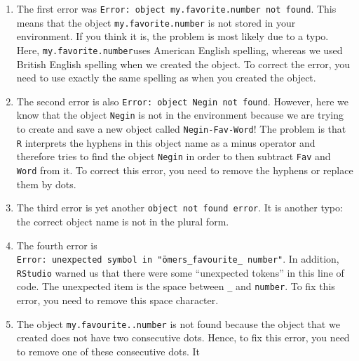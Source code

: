 \documentclass[
  letterpaper,
  DIV=11,
  numbers=noendperiod,
  oneside]{scrreprt}
\begin{document}
\begin{tcolorbox}[enhanced jigsaw, leftrule=.75mm, arc=.35mm, opacityback=0, rightrule=.15mm, left=2mm, colback=white, title=\textcolor{quarto-callout-note-color}{\faInfo}\hspace{0.5em}{Click here for the solutions}, colframe=quarto-callout-note-color-frame, coltitle=black, colbacktitle=quarto-callout-note-color!10!white, bottomtitle=1mm, toptitle=1mm, titlerule=0mm, bottomrule=.15mm, opacitybacktitle=0.6, breakable, toprule=.15mm]

\begin{enumerate}
\def\labelenumi{\arabic{enumi}.}
\item
  The first error was
  \texttt{Error:\ object\ \textquotesingle{}my.favorite.number\textquotesingle{}\ not\ found}.
  This means that the object \texttt{my.favorite.number} is not stored
  in your environment. If you think it is, the problem is most likely
  due to a typo. Here, \texttt{my.favorite.number}uses American English
  spelling, whereas we used British English spelling when we created the
  object. To correct the error, you need to use exactly the same
  spelling as when you created the object.
\item
  The second error is also
  \texttt{Error:\ object\ \textquotesingle{}Negin\textquotesingle{}\ not\ found}.
  However, here we know that the object \texttt{Negin} is not in the
  environment because we are trying to create and save a new object
  called \texttt{Negin-Fav-Word}! The problem is that \texttt{R}
  interprets the hyphens in this object name as a minus operator and
  therefore tries to find the object \texttt{Negin} in order to then
  subtract \texttt{Fav} and \texttt{Word} from it. To correct this
  error, you need to remove the hyphens or replace them by dots.
\item
  The third error is yet another \texttt{object\ not\ found\ error}. It
  is another typo: the correct object name is not in the plural form.
\item
  The fourth error is
  \texttt{Error:\ unexpected\ symbol\ in\ "ömers\_favourite\_\ number"}.
  In addition, \texttt{RStudio} warned us that there were some
  ``unexpected tokens'' in this line of code. The unexpected item is the
  space between \texttt{\_} and \texttt{number}. To fix this error, you
  need to remove this space character.
\item
  The object \texttt{my.favourite..number} is not found because the
  object that we created does not have two consecutive dots. Hence, to
  fix this error, you need to remove one of these consecutive dots. It

\end{enumerate}
\end{tcolorbox}
\end{document}

